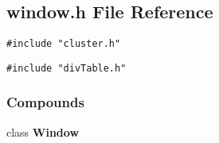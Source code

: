 \subsection{window.h File Reference}
\label{window.h}
{\tt \#include "cluster.h"}\par
{\tt \#include "div\-Table.h"}\par
\subsubsection*{Compounds}
\begin{CompactItemize}
\item 
class {\bf Window}
\end{CompactItemize}
